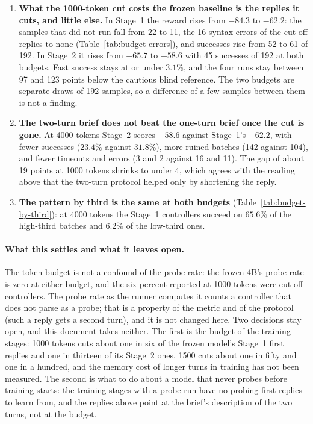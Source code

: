 \documentclass[11pt,a4paper]{article}
\begin{document}
\begin{enumerate}[leftmargin=1.5em]
  \item \textbf{What the 1000-token cut costs the frozen baseline is the
  replies it cuts, and little else.} In Stage~1 the reward rises from $-84.3$
  to $-62.2$: the samples that did not run fall from 22 to 11, the 16 syntax
  errors of the cut-off replies to none
  (Table~\ref{tab:budget-errors}), and successes rise from 52 to 61 of 192.
  In Stage~2 it rises from $-65.7$ to $-58.6$ with 45 successes of 192 at
  both budgets. Fast success stays at or under $3.1\%$, and the four runs
  stay between 97 and 123 points below the cautious blind reference. The two
  budgets are separate draws of 192 samples, so a difference of a few samples
  between them is not a finding.

  \item \textbf{The two-turn brief does not beat the one-turn brief once the
  cut is gone.} At 4000 tokens Stage~2 scores $-58.6$ against Stage~1's
  $-62.2$, with fewer successes ($23.4\%$ against $31.8\%$), more ruined
  batches (142 against 104), and fewer timeouts and errors (3 and 2 against
  16 and 11). The gap of about 19 points at 1000 tokens shrinks to under 4,
  which agrees with the reading above that the two-turn protocol helped only
  by shortening the reply.

  \item \textbf{The pattern by third is the same at both budgets}
  (Table~\ref{tab:budget-by-third}): at 4000 tokens the Stage~1 controllers
  succeed on $65.6\%$ of the high-third batches and $6.2\%$ of the low-third
  ones.
\end{enumerate}

\paragraph{What this settles and what it leaves open.} The token budget is
not a confound of the probe rate: the frozen 4B's probe rate is zero at
either budget, and the six percent reported at 1000 tokens were cut-off
controllers. The probe rate as the runner computes it counts a controller
that does not parse as a probe; that is a property of the metric and of the
protocol (such a reply gets a second turn), and it is not changed here. Two
decisions stay open, and this document takes neither. The first is the
budget of the training stages: 1000 tokens cuts about one in six of the
frozen model's Stage~1 first replies and one in thirteen of its Stage~2
ones, 1500 cuts about one in fifty and one in a hundred, and the memory
cost of longer turns in training has not been measured. The second is what
to do about a model that never probes before training starts: the training
stages with a probe run have no probing first replies to learn from, and
the replies above point at the brief's description of the two turns, not at
the budget.
\end{document}
